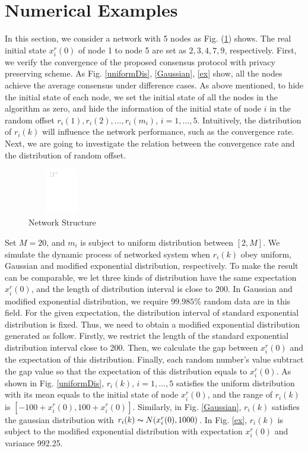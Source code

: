 \documentclass[10pt,journal,compsoc]{IEEEtran}
\begin{document}
\section{Numerical Examples}\label{Numerical Example}
In this section, we consider a network with 5 nodes as Fig. (\ref{struc}) shows. The real initial state $x^{r}_{i}(0)$ of node 1 to node 5 are set as  $2, 3, 4, 7, 9$, respectively. First, we verify the convergence of the proposed consensus protocol with privacy preserving scheme. As Fig. \ref{uniformDis}, \ref{Gaussian}, \ref{ex} show, all the nodes achieve the average consensus under difference cases. As above mentioned, to hide the initial state of each node, we set the initial state of all the nodes in the algorithm as zero, and hide the information of the initial state of node $i$ in the random offset ${r_{i}(1), r_{i}(2), ..., r_{i}(m_{i})}$, $i=1,\ldots, 5$. Intuitively, the distribution of $r_{i}(k)$ will influence the network performance, such as the convergence rate. Next, we are going to investigate the relation between the convergence rate and the distribution of random offset.
\begin{figure}[!htb]
 \centering
 \includegraphics[width=3cm, height=2cm]{structure}
 \caption{Network Structure}
 \label{struc}
\end{figure}
Set $M=20$, and $m_i$ is subject to uniform distribution between $[2,M]$. We simulate the dynamic process of networked system when $r_{i}(k)$ obey uniform, Gaussian and modified exponential distribution, respectively. To make the result can be comparable, we let three kinds of distribution have the same expectation $x_{i}^{r}(0)$, and the length of distribution interval is close to 200. In Gaussian and modified exponential distribution, we require $99.985\%$ random data are in this field. For the given expectation, the distribution interval of standard exponential distribution is fixed. Thus, we need to obtain a modified exponential distribution generated as follow. Firstly, we restrict the length of the standard exponential distribution interval close to 200. Then, we calculate the gap between $x_{i}^{r}(0)$ and the expectation of this distribution. Finally, each random number's value subtract the gap value so that the expectation of this distribution equals to $x_{i}^{r}(0)$. As shown in Fig. \ref{uniformDis}, $r_i(k)$, $i=1,\ldots,5$ satisfies the uniform distribution with its mean equals to the initial state of node $x_{i}^{r}(0)$, and the range of $r_i(k)$ is $[-100+x_{i}^{r}(0),100+x_{i}^{r}(0)]$. Similarly, in Fig. \ref{Gaussian}, $r_{i}(k)$ satisfies the gaussian distribution with $r_i(k)\thicksim N(x_{i}^{r}(0),1000)$. In Fig. \ref{ex}, $r_{i}(k)$ is subject to the modified exponential distribution with expectation $x_{i}^{r}(0)$ and variance 992.25.
\end{document}
